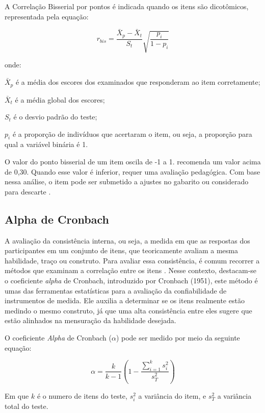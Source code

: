 A Correlação Bisserial por pontos é indicada quando os itens são dicotômicos, representada pela equação:


\begin{equation}
	r_{bis} = \frac{\bar{X}_p - \bar{X}_t}{S_t}
	\sqrt{\frac{p_i}{1 - p_i}}
\end{equation}

onde:


\noindent $ \bar{X}_p $ é a média dos escores dos examinados que responderam ao item corretamente;

\noindent $ \bar{X}_t $ é a média global dos escores;

\noindent $ S_t $ é o desvio padrão do teste;

\noindent $ p_i $  é a proporção de indivíduos que acertaram o item, ou seja, a proporção para qual a variável binária é 1.


O valor do ponto bisserial de um item oscila de -1 a 1. \cite{pasquali2003} recomenda um valor acima de 0,30. Quando esse valor é inferior, requer uma avaliação pedagógica. Com base nessa análise, o item pode ser submetido a ajustes no gabarito ou considerado para descarte \cite{andrade2010uso}.


\subsection{Alpha de Cronbach}

A avaliação da consistência interna, ou seja, a medida em que as respostas dos participantes em um conjunto de itens, que teoricamente avaliam a mesma habilidade, traço ou construto. 
Para avaliar essa consistência, é comum recorrer a métodos que examinam a correlação entre os itens \cite{souza2017}. Nesse contexto, destacam-se o coeficiente \textit{alpha} de Cronbach, introduzido por Cronbach (1951), este método é umas das ferramentas estatísticas para a avaliação da confiabilidade de instrumentos de medida. Ele auxilia  a determinar se os itens realmente estão medindo o mesmo construto, já que uma alta consistência entre eles sugere que estão alinhados na mensuração da habilidade desejada.

O coeficiente \textit{Alpha} de Cronbach ($\alpha$) pode ser medido por meio da seguinte equação:

\begin{equation}
	\alpha = \frac{k}{k-1}(1 - \frac{\sum_{i=1}^{k}{s^2_i}}{s_T^2})
\end{equation}

 Em que $k$ é o numero de itens do teste, ${s_i^2}$ a variância do item, e
${s_T^2}$ a variância total do teste.


